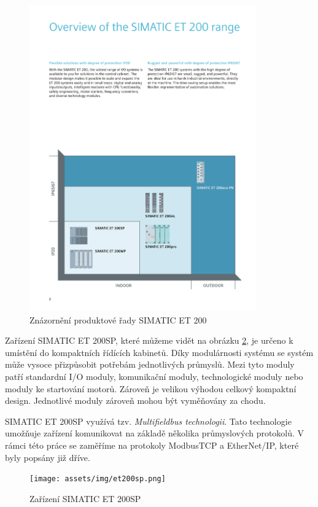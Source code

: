 \begin{figure}[htbp]
    \centering 
    \includegraphics[width=0.87\textwidth]{assets/img/et200.pdf}
    \caption{Znázornění produktové řady SIMATIC ET 200}
    \label{fig:et200}
\end{figure}

Zařízení SIMATIC ET 200SP, které můžeme vidět na obrázku \ref{fig:et200sp}, je určeno k umístění do kompaktních řídících kabinetů. Díky modulárnosti systému se systém může vysoce přizpůsobit potřebám jednotlivých průmyslů. Mezi tyto moduly patří standardní I/O moduly, komunikační moduly, technologické moduly nebo moduly ke startování motorů. Zároveň je velikou výhodou celkový kompaktní design. Jednotlivé moduly zároveň mohou být vyměňovány za chodu. \cite{et200sp}

SIMATIC ET 200SP využívá tzv. \textit{Multifieldbus technologii}. Tato technologie umožňuje zařízení komunikovat na základě několika průmyslových protokolů. V rámci této práce se zaměříme na protokoly ModbusTCP a EtherNet/IP, které byly popsány již dříve.

\begin{figure}[htbp]
    \centering 
    \texttt{[image: assets/img/et200sp.png]}
    \caption{Zařízení SIMATIC ET 200SP}
    \label{fig:et200sp}
\end{figure}